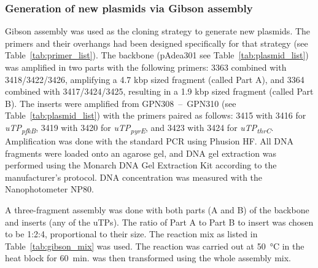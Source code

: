 \subsubsection{Generation of new plasmids via Gibson assembly} \label{txt:Cloning}
Gibson assembly \parencite{gibson_enzymatic_2009} was used as the cloning strategy to generate new plasmids. The primers and their overhangs had been designed specifically for that strategy (see Table~\ref{tab:primer_list}). The backbone (pAdea301 see Table~\ref{tab:plasmid_list}) was amplified in two parts with the following primers: 3363 combined with 3418/3422/3426, amplifying a 4.7 kbp sized fragment (called Part A), and 3364 combined with 3417/3424/3425, resulting in a 1.9 kbp sized fragment (called Part B). The inserts were amplified from GPN308~--~GPN310 (see Table~\ref{tab:plasmid_list}) with the primers paired as follows: 3415 with 3416 for \textit{uTP\textsubscript{pfkB}}, 3419 with 3420 for \textit{uTP\textsubscript{pyrE}}, and 3423 with 3424 for \textit{uTP\textsubscript{thrC}}. Amplification was done with the standard PCR using Phusion HF. All DNA fragments were loaded onto an agarose gel, and DNA gel extraction was performed using the Monarch DNA Gel Extraction Kit according to the manufacturer's protocol. DNA concentration was measured with the Nanophotometer  NP80. 

\par A three-fragment assembly was done with both parts (A and B) of the backbone and inserts (any of the uTPs). The ratio of Part A to Part B to insert was chosen to be 1:2:4, proportional to their size.  The reaction mix as listed in Table~\ref{tab:gibson_mix} was used. The reaction was carried out at 50~°C in the heat block for 60~min.  was then transformed using the whole assembly mix. 

